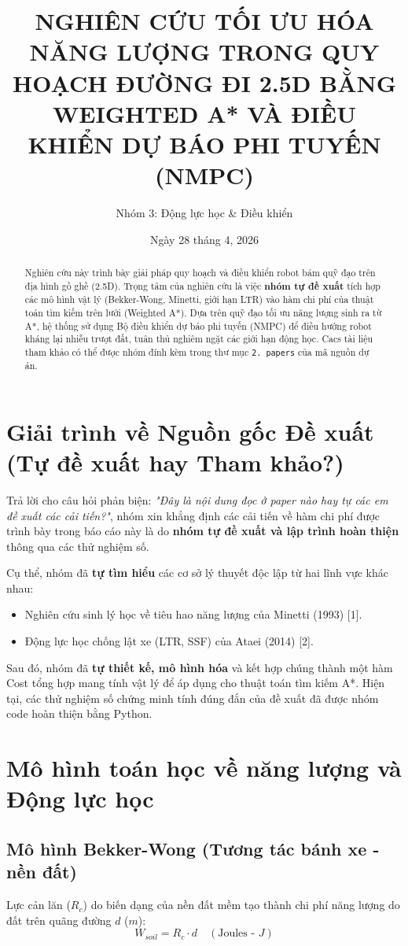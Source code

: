 \documentclass[12pt, a4paper]{article}
\title{\textbf{NGHIÊN CỨU TỐI ƯU HÓA NĂNG LƯỢNG TRONG QUY HOẠCH ĐƯỜNG ĐI 2.5D BẰNG WEIGHTED A* VÀ ĐIỀU KHIỂN DỰ BÁO PHI TUYẾN (NMPC)}}
\author{Nhóm 3: Động lực học \& Điều khiển}
\date{Ngày 28 tháng 4, 2026}
\begin{document}
\maketitle

\begin{abstract}
Nghiên cứu này trình bày giải pháp quy hoạch và điều khiển robot bám quỹ đạo trên địa hình gồ ghề (2.5D). Trọng tâm của nghiên cứu là việc \textbf{nhóm tự đề xuất} tích hợp các mô hình vật lý (Bekker-Wong, Minetti, giới hạn LTR) vào hàm chi phí của thuật toán tìm kiếm trên lưới (Weighted A*). Dựa trên quỹ đạo tối ưu năng lượng sinh ra từ A*, hệ thống sử dụng Bộ điều khiển dự báo phi tuyến (NMPC) để điều hướng robot kháng lại nhiễu trượt đất, tuân thủ nghiêm ngặt các giới hạn động học. Cacs tài liệu tham khảo có thể được nhóm đính kèm trong thư mục \texttt{2. papers} của mã nguồn dự án.
\end{abstract}

\section{Giải trình về Nguồn gốc Đề xuất (Tự đề xuất hay Tham khảo?)}
Trả lời cho câu hỏi phản biện: \textit{"Đây là nội dung đọc ở paper nào hay tự các em đề xuất các cải tiến?"}, nhóm xin khẳng định các cải tiến về hàm chi phí được trình bày trong báo cáo này là do \textbf{nhóm tự đề xuất và lập trình hoàn thiện} thông qua các thử nghiệm số.

Cụ thể, nhóm đã \textbf{tự tìm hiểu} các cơ sở lý thuyết độc lập từ hai lĩnh vực khác nhau:
\begin{itemize}
    \item Nghiên cứu sinh lý học về tiêu hao năng lượng của Minetti (1993) [1].
    \item Động lực học chống lật xe (LTR, SSF) của Ataei (2014) [2].
\end{itemize}
Sau đó, nhóm đã \textbf{tự thiết kế, mô hình hóa} và kết hợp chúng thành một hàm Cost tổng hợp mang tính vật lý để áp dụng cho thuật toán tìm kiếm A*. Hiện tại, các thử nghiệm số chứng minh tính đúng đắn của đề xuất đã được nhóm code hoàn thiện bằng Python.

\section{Mô hình toán học về năng lượng và Động lực học}

\subsection{Mô hình Bekker-Wong (Tương tác bánh xe - nền đất)}
Lực cản lăn ($R_c$) do biến dạng của nền đất mềm tạo thành chi phí năng lượng do đất trên quãng đường $d$ ($m$):
\begin{equation}
    W_{soil} = R_c \cdot d \quad (\text{Joules - } J)
\end{equation}
\end{document}

